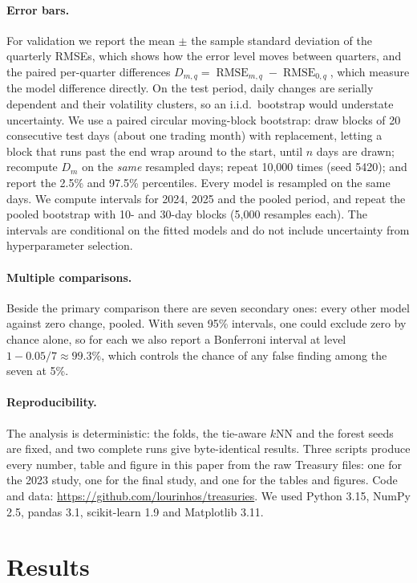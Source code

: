 \documentclass{article}
\newcommand{\RMSE}{\operatorname{RMSE}}
\begin{document}
\paragraph{Error bars.} For validation we report the mean $\pm$ the sample standard deviation of the quarterly RMSEs, which shows how the error level moves between quarters, and the paired per-quarter differences $D_{m,q} = \RMSE_{m,q} - \RMSE_{0,q}$, which measure the model difference directly. On the test period, daily changes are serially dependent and their volatility clusters, so an i.i.d.\ bootstrap would understate uncertainty. We use a paired circular moving-block bootstrap: draw blocks of 20 consecutive test days (about one trading month) with replacement, letting a block that runs past the end wrap around to the start, until $n$ days are drawn; recompute $D_m$ on the \emph{same} resampled days; repeat 10,000 times (seed 5420); and report the 2.5\% and 97.5\% percentiles. Every model is resampled on the same days. We compute intervals for 2024, 2025 and the pooled period, and repeat the pooled bootstrap with 10- and 30-day blocks (5,000 resamples each). The intervals are conditional on the fitted models and do not include uncertainty from hyperparameter selection.

\paragraph{Multiple comparisons.} Beside the primary comparison there are seven secondary ones: every other model against zero change, pooled. With seven 95\% intervals, one could exclude zero by chance alone, so for each we also report a Bonferroni interval at level $1 - 0.05/7 \approx 99.3\%$, which controls the chance of any false finding among the seven at 5\%.

\paragraph{Reproducibility.} The analysis is deterministic: the folds, the tie-aware $k$NN and the forest seeds are fixed, and two complete runs give byte-identical results. Three scripts produce every number, table and figure in this paper from the raw Treasury files: one for the 2023 study, one for the final study, and one for the tables and figures. Code and data: \url{https://github.com/lourinhos/treasuries}. We used Python 3.15, NumPy 2.5, pandas 3.1, scikit-learn 1.9 and Matplotlib 3.11.

\section{Results}\label{sec:results}
\end{document}
